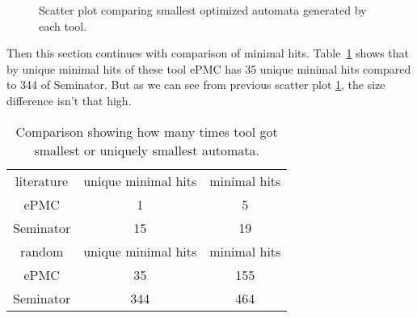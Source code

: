 \documentclass[
	digital,
nolof, nolot
]{fithesis3}
\begin{document}
\begin{figure}[ht]
	\centering
	
	\caption{Scatter plot comparing smallest optimized automata generated by each tool. }
	\label{scatter:slim-epmc}
	\begin{tikzpicture}
		
	\end{tikzpicture}
\end{figure}
Then this section continues with comparison of minimal hits. Table~\ref{table:epmc-seminator-min-hits} shows that by unique minimal hits of these tool ePMC has 35 unique minimal hits compared to 344 of Seminator. But as we can see from previous scatter plot \ref{scatter:slim-epmc}, the size difference isn't that high.
\begin{table}[ht]
	\centering
	
	\caption{Comparison showing how many times tool got smallest or uniquely smallest automata.}
	\label{table:epmc-seminator-min-hits}
	\begin{tabular}{ |c||c|c| } 
		\hline
		literature&unique minimal hits&minimal hits\\
		\hhline{|===|}
		ePMC&1 & 5\\
		\hline
		Seminator &15 & 19\\ 
		\hline
		\hline
		random&unique minimal hits&minimal hits\\
		\hhline{|===|}
		ePMC&35 & 155\\
		\hline
		Seminator &344 & 464\\ 
		\hline
	\end{tabular}
\end{table}
		
	
	
	
		
		
\end{document}
